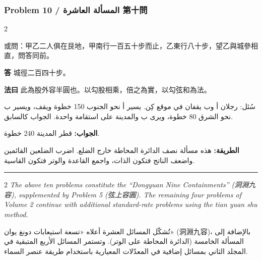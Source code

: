 \documentclass[11pt,a4paper]{article}
\newcommand{\ar}[1]{\arabicfont\beginR #1\endR}
\newcommand{\Answer}[1]{\par\noindent\textbf{\color{problemcolor}答} #1\par}
\newcommand{\Method}[1]{\par\noindent\textbf{\color{problemcolor}法曰} #1\par}
\newcommand{\AnswerAr}{\par\noindent\textbf{\color{problemcolor}\ar{الجواب:}} }
\newcommand{\MethodAr}{\par\noindent\textbf{\color{problemcolor}\ar{الطريقة:}} }
\begin{document}
\vspace{0.5cm}

\subsubsection*{Problem 10 / \ar{المسألة العاشرة} \quad 第十問}

\begin{paracol}{2}

\noindent 或問：甲乙二人俱在艮地，甲南行一百五十步而止，乙東行八十步，望乙與城參相直，問答同前。

\vspace{0.2cm}

\Answer{城徑二百四十步。}

\vspace{0.2cm}

\Method{此為股外容半圓也。以勾股相乘，倍之為實，以勾弦和為法。}

\switchcolumn

\ar{سُئل: رجلان أ وب يقفان في موقع كِن. يسير أ نحو الجنوب 150 خطوة ويقف، ويسير ب نحو الشرق 80 خطوة، ويرى ب والمدينة على استقامة واحدة. الجواب كالسابق.}

\vspace{0.2cm}

\AnswerAr{قطر المدينة 240 خطوة.}

\vspace{0.2cm}

\MethodAr{هذه مسألة نصف الدائرة المحاطة خارج الضلع. اضرب الضلعين القائمين واضعف الناتج فتكون الذات، واجمع القاعدة والوتر فتكون القاسية.}

\end{paracol}

\vspace{0.5cm}

\noindent\textcolor{rulecolor}{\rule{\textwidth}{0.4pt}}

\vspace{0.3cm}

\begin{paracol}{2}
\textit{The above ten problems constitute the ``Dongyuan Nine Containments'' (洞淵九容), supplemented by Problem 5 (弦上容圓). The remaining four problems of Volume 2 continue with additional standard-rate problems using the tian yuan shu method.}

\switchcolumn

\ar{تُشكّل المسائل العشرة أعلاه «تسعة استيعابات دونغ يوان» (洞淵九容)، بالإضافة إلى المسألة الخامسة (الدائرة المحاطة على الوتر). وتستمر المسائل الأربع المتبقية في المجلد الثاني بمسائل إضافية في المعدّلات المعيارية باستخدام طريقة عنصر السماء.}

\end{paracol}
\end{document}
